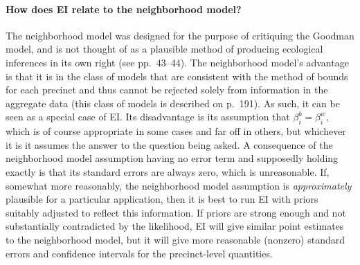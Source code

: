 \documentclass[11pt,titlepage]{article}
\begin{document}
\paragraph{How does EI relate to the neighborhood model?}
The neighborhood model was designed for the purpose of critiquing the
Goodman model, and is not thought of as a plausible method of
producing ecological inferences in its own right (see pp.\ 43--44).
The neighborhood model's advantage is that it is in the class of
models that are consistent with the method of bounds for each precinct
and thus cannot be rejected solely from information in the aggregate
data (this class of models is described on p.\ 191).  As such, it can
be seen as a special case of EI.  Its disadvantage is its assumption
that $\beta_i^b=\beta_i^w$, which is of course appropriate in some
cases and far off in others, but whichever it is it assumes the answer
to the question being asked.  A consequence of the neighborhood model
assumption having no error term and supposedly holding exactly is that
its standard errors are always zero, which is unreasonable.  If,
somewhat more reasonably, the neighborhood model assumption is
\emph{approximately} plausible for a particular application, then it
is best to run EI with priors suitably adjusted to reflect this
information.  If priors are strong enough and not substantially
contradicted by the likelihood, EI will give similar point estimates
to the neighborhood model, but it will give more reasonable (nonzero)
standard errors and confidence intervals for the precinct-level
quantities.
\end{document}
